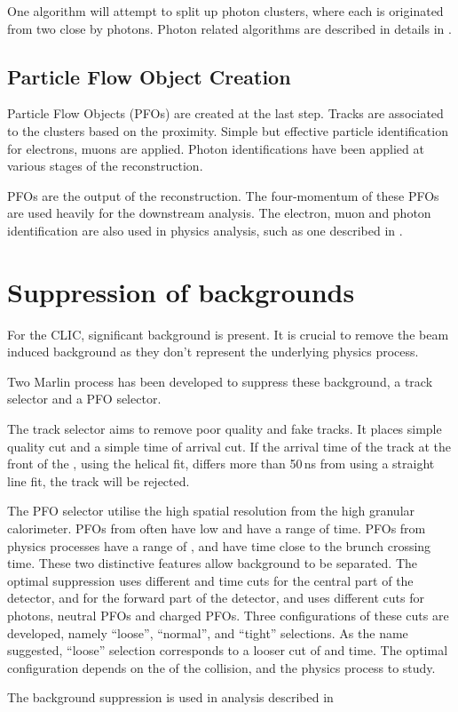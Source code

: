 One algorithm will attempt to split up photon clusters, where each is originated from two close by photons. Photon related algorithms are described in details in .



\subsection{Particle Flow Object Creation}
\label{sec:pandoraPFOcreation}

Particle Flow Objects (PFOs) are created at the last step. Tracks are associated to the clusters based on the proximity. Simple but effective particle identification for electrons, muons are applied. Photon identifications have been applied at various stages of the reconstruction.

PFOs are the output of the \pandora reconstruction. The four-momentum of these PFOs are  used heavily for the downstream analysis. The electron, muon and photon identification are  also used in physics analysis, such as one described in .

\section{Suppression of \ggHad backgrounds}

For the CLIC, significant \ggHad background is present. It is crucial to remove the beam induced background as they don't represent the underlying physics process.

Two Marlin process has been developed to suppress these background, a track selector and a PFO selector\cite{Marshall:2012ry}.

The track selector aims to remove poor quality and fake tracks. It places simple quality cut and a simple time of arrival cut. If the arrival time of the track at the front of the \ECAL, using the helical fit, differs more than 50\,ns from using a straight line fit, the track will be rejected.

The PFO selector utilise the high spatial resolution from the high granular calorimeter. PFOs from \ggHad often have low \pT and have a range of time. PFOs from physics processes have a range of \pT, and have time close to the brunch crossing time. These two distinctive features allow \ggHad background to be separated. The optimal suppression uses different \pT and time cuts for the central part of the detector, and for the forward part of the detector, and uses different cuts for photons, neutral PFOs and charged PFOs. Three configurations of these cuts are developed, namely ``loose'', ``normal'', and ``tight'' selections. As the name suggested, ``loose'' selection corresponds to a looser cut of \pT and time. The optimal configuration depends on the \sqrtS of the collision, and the physics process to study.

The background suppression is used in analysis described in 
